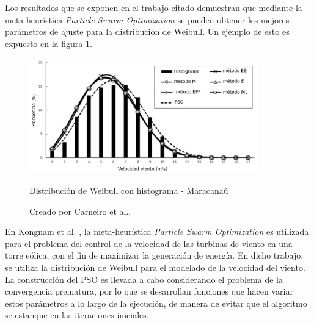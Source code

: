 Los resultados que se exponen en el trabajo citado demuestran que mediante la meta-heurística \emph{Particle Swarm Optimization} se pueden obtener los mejores parámetros de ajuste para la distribución de Weibull. Un ejemplo de esto es expuesto en la figura \ref{fig:pso_fit}.\\
\begin{figure}[h!]
    \centering    
    \includegraphics[height=50mm]{figures/pso_fit.png} 
    \caption{Distribución de Weibull con histograma - Maracanaú}
    \vspace{-.25cm} 
    \caption*{Creado por Carneiro et al.\cite{Carneiro15}.}
    \label{fig:pso_fit}
\end{figure}
En Kongnam et al. \cite{Kongnam15}, la meta-heurística \emph{Particle Swarm Optimization} es utilizada para el problema del control de la velocidad de las turbinas de viento en una torre eólica, con el fin de maximizar la generación de energía. En dicho trabajo, se utiliza la distribución de Weibull para el modelado de la velocidad del viento. La construcción del PSO es llevada a cabo considerando el problema de la convergencia prematura, por lo que se desarrollan funciones que hacen variar estos parámetros a lo largo de la ejecución, de manera de evitar que el algoritmo se estanque en las iteraciones iniciales.\\

